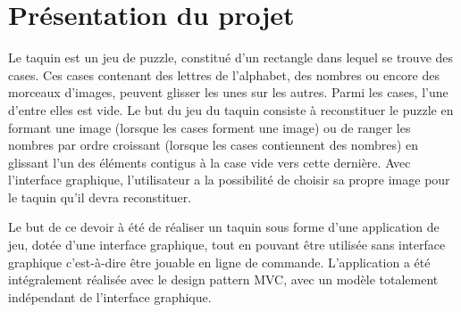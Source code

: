\chapter{Présentation du projet}

		Le taquin est un jeu de puzzle, constitué d’un rectangle dans lequel se trouve des cases. Ces cases contenant des lettres de l'alphabet,
		des nombres ou encore des morceaux d’images, peuvent glisser les unes sur les autres. Parmi les cases, l’une d'entre elles est vide.
		Le but du jeu du taquin consiste à reconstituer le puzzle en formant une image (lorsque les cases forment une image) ou de ranger les nombres par ordre croissant
		(lorsque les cases contiennent des nombres) en glissant l'un des éléments contigus à la case vide vers cette dernière. Avec l’interface graphique, l'utilisateur a la possibilité de choisir sa propre image pour le taquin qu’il devra reconstituer.

		Le but de ce devoir à été de réaliser un taquin sous forme d’une application de jeu, dotée d'une interface graphique, tout en pouvant être utilisée
		sans interface graphique c'est-à-dire être jouable en ligne de commande. L'application a été intégralement réalisée avec le design pattern MVC,
		avec un modèle totalement indépendant de l'interface graphique.
